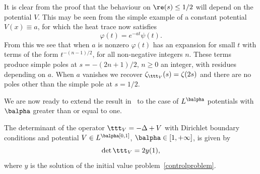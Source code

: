 \begin{remark}
It is clear from the proof that the behaviour on $\re(s)\leq 1/2$ will depend on the potential $V$. This may be seen from the simple example of a constant
potential $V(x) \equiv a$, for which the heat trace now satisfies
\[
\varphi(t) = e^{-a t}\psi(t).
\]
From this we see that when $a$ is nonzero $\varphi(t)$ has an expansion for small $t$ with terms of the form $t^{-(n-1)/2}$, for all non-negative
integers $n$. These terms produce simple poles at $s=-(2n+1)/2$, $n\geq 0$ an integer, with residues depending on $a$. When $a$ vanishes
we recover $\zeta_{\ttt_V}(s) = \zeta(2s)$ and there are no poles other than the simple pole at $s=1/2$.
\end{remark}

We are now ready to extend the result in~\cite{Levit-Smilansky} to the case of
$L^{\balpha}$ potentials with $\balpha$ greater than or equal to one.
\begin{theorem} \label{thm0}
The determinant of the operator $\ttt_V =-\Delta + V$ with Dirichlet boundary
conditions and potential $V\in L^\balpha[0,1]$, $\balpha \in[1,+\infty]$,
is given by
\begin{equation}\label{eq:dety1}
\det\ttt_V = 2y(1),
\end{equation}
where $y$ is the solution of the initial value problem~\eqref{controlproblem}.
\end{theorem}
